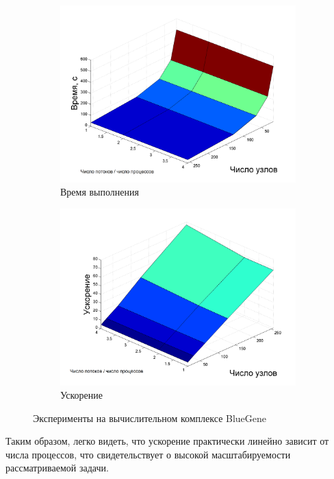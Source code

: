 \documentclass[a4paper,12pt]{report}
\begin{document}
	\begin{figure}[H]
			\begin{subfigure}{0.5\textwidth}
				\includegraphics[width=\textwidth]{hyb_bg.png}
				\caption{Время выполнения}
			\end{subfigure}
			\begin{subfigure}{0.5\textwidth}
				\includegraphics[width=\textwidth]{hyb_bg_speedup.png}
				\caption{Ускорение}
			\end{subfigure}
			\caption{Эксперименты на вычислительном комплексе BlueGene}
			\label{bg}
		\end{figure}\par


	\par Таким образом, легко видеть, что ускорение практически линейно зависит от числа процессов, что свидетельствует о  высокой масштабируемости рассматриваемой задачи.
\end{document}
